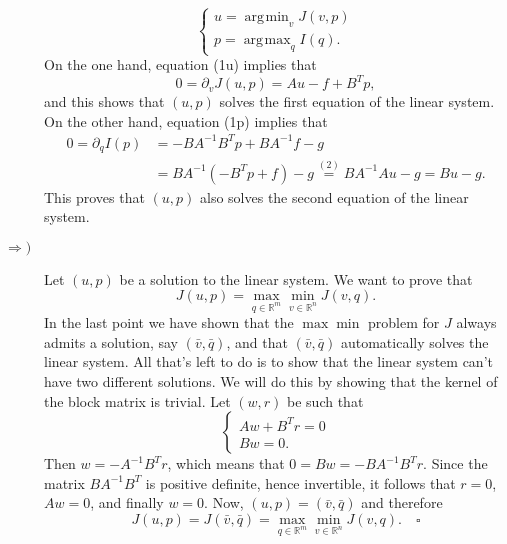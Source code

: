 \documentclass[a4paper]{article}
\DeclareMathOperator*{\argmin}{\arg\!\min}
\DeclareMathOperator*{\argmax}{\arg\!\max}
\newcommand{\R}{\mathbb{R}}
\begin{document}
\begin{description}
	\begin{equation}
	\begin{cases}
	u = \argmin_v J(v,p) \\
	p = \argmax_q{I(q)}.
	\end{cases}
	\end{equation}
	On the one hand, equation (1u) implies that
	\begin{equation}
	0 = \partial_v J(u,p) = Au-f+B^Tp,
	\end{equation}
	and this shows that $(u,p)$ solves the first equation of the linear system.
	On the other hand, equation (1p) implies that
	\begin{align*}
	0
	= \partial_q I(p)
&	= -BA^{-1}B^T p + B A^{-1} f - g \\
&	= BA^{-1}(-B^T p + f) - g
	\stackrel{(2)}{=} BA^{-1}Au - g
	= Bu - g.
	\end{align*}
	This proves that $(u,p)$ also solves the second equation of the linear system.
\item[$\Rightarrow)$] Let $(u,p)$ be a solution to the linear system.
	We want to prove that
	\[
	J(u,p) = \max_{q \in \R^m} \min_{v \in \R^n} J(v,q).
	\]
	In the last point we have shown that the $\max\min$ problem
	for $J$ always admits a solution, say $(\bar{v},\bar{q})$,
	and that $(\bar{v},\bar{q})$ automatically solves the linear system.
	All that's left to do is to show that the linear system can't have two different
	solutions. We will do this by showing that the kernel of the block matrix is trivial.
	Let $(w,r)$ be such that
	\[
	\begin{cases}
	Aw + B^Tr = 0 \\
	Bw = 0.
	\end{cases}
	\]
	Then $w = -A^{-1}B^Tr$, which means that $0 = Bw = -BA^{-1}B^Tr$.
	Since the matrix $BA^{-1}B^T$ is positive definite, hence invertible,
	it follows that $r=0$, $Aw = 0$, and finally $w = 0$.
	Now, $(u,p)=(\bar{v},\bar{q})$ and therefore
	\[
	J(u,p) = J(\bar{v},\bar{q}) = \max_{q \in \R^m} \min_{v \in \R^n} J(v,q). \quad \square
	\]
\end{description}
\end{document}
